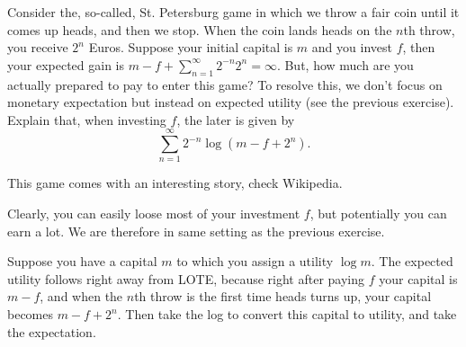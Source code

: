 \documentclass[lectures]{subfiles}
\begin{document}
\begin{exercise}
Consider the, so-called, St.
Petersburg game in which we throw a fair coin until it comes up heads, and then we stop.
When the coin lands heads on the $n$th throw, you receive $2^{n}$ Euros.
Suppose your initial capital is $m$ and you invest $f$, then your expected gain is $m-f + \sum_{n=1}^{\infty} 2^{-n} 2^{n} = \infty$.
But, how much are you actually prepared to pay to enter this game?
To resolve this, we don't focus on monetary expectation but instead on expected utility (see the previous exercise).
Explain that, when investing $f$, the later is given by
\begin{equation}
  \label{eq:5}
  \sum_{n=1}^{\infty} 2^{-n}\log(m - f + 2^{n}).
\end{equation}
\begin{solution}
This game comes with an interesting story,  check Wikipedia.

Clearly, you can easily loose most of your investment $f$, but potentially you can earn a lot. We are therefore in same setting as the previous exercise.

Suppose you have a capital $m$ to which you assign a utility $\log m$.
The expected utility follows right away from LOTE,
because right after paying $f$ your capital is $m-f$, and when the $n$th throw is the first time heads turns up, your capital becomes $m-f+2^{n}$.
Then take the log to convert this capital to utility, and take the expectation.
\end{solution}
\end{exercise}
\end{document}
